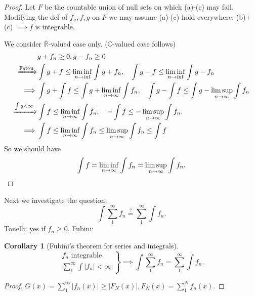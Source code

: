 \documentclass{report}
\newcommand{\R}{\mathbb{R}}
\newcommand{\C}{\mathbb{C}}
\newtheorem{corollary}[theorem]{Corollary}
\theoremstyle{definition}
\theoremstyle{remark}
\begin{document}
\begin{proof}
	Let $F$ be the countable union of null sets on which (a)-(c) may fail. Modifying the def of $f_n, f, g$ on $F$ we may assume (a)-(c) hold everywhere. (b)+(c) $\implies f$ is integrable.

	We consider $\overline{\R}$-valued case only. ($\C$-valued case follows)
	\begin{align*}
		& g + f_n \geq 0, g - f_n \geq 0 \\
		\xRightarrow[]{\text{Fatou}} & \int g + f \leq \liminf_{n \to \inf} \int g + f_n,\quad \int g - f \leq \liminf_{n \to \inf} \int g - f_n  \\
		\implies & \int g + \int f \leq \int g + \liminf_{n \to \infty} \int f_n,\quad \int g - \int f \leq \int g - \limsup_{n \to \infty} \int f_n \\
		\xRightarrow[]{\int g < \infty} & \int f \leq \liminf_{n \to \infty} \int f_n,\quad - \int f \leq - \limsup_{n \to \infty} \int f_n. \\
		\implies & \int f \leq \liminf_{n \to \infty} \int f_n \leq \limsup_{n \to \infty} \int f_n \leq \int f
	\end{align*}
	So we should have \[ \int f = \liminf_{n \to \infty} \int f_n = \limsup_{n \to \infty} \int f_n. \qedhere \]
\end{proof}
Next we investigate the question:
\[\int \sum_{1}^\infty f_n \stackrel{\text{?}}{=} \sum_{1}^\infty \int f_n.\]
Tonelli: yes if $f_n \geq 0$.
Fubini:
\begin{corollary}[Fubini's theorem for series and integrals]
	\[\left.\begin{array}{r}
		f_n \text{ integrable} \\
		\displaystyle \sum_1^\infty \int |f_n| < \infty
	\end{array}\right\} \implies \int \sum_{1}^\infty f_n = \sum_{1}^\infty \int f_n.\]
\end{corollary}
\begin{proof}
	$\displaystyle G(x) = \sum_1^\infty |f_n(x)| \geq |F_N(x)|, F_N(x) = \sum_1^N f_n(x)$.
\end{proof}


{}

\end{document}
